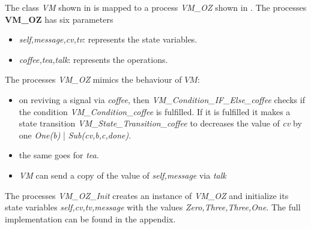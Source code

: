 The class \textit{VM} shown in  is mapped to a \picalc{} process \textit{VM\_OZ} shown in . The processes \textbf{VM\_OZ} has six parameters
\begin{itemize}
\item \textit{self,message,cv,tv}: represents the state variables.
\item \textit{coffee,tea,talk}: represents the operations.
\end{itemize}
The processes \textit{VM\_OZ} mimics the behaviour of $VM$:
\begin{itemize}
\item on reviving a signal via \textit{coffee}, then \textit{VM\_Condition\_IF\_Else\_coffee} checks if the condition \textit{VM\_Condition\_coffee} is fulfilled. If it is fulfilled it makes a state transition \textit{VM\_State\_Transition\_coffee} to decreases the value of \textit{cv} by one \textit{One(b) }| \textit{Sub(cv,b,c,done)}.
\item the same goes for \textit{tea}.
\item  \textit{VM} can send a copy of the value of  \textit{self,message} via  \textit{talk}
\end{itemize}
The processes \textit{VM\_OZ\_Init} creates an instance of \textit{VM\_OZ} and initialize its state variables \textit{self,cv,tv,message} with the values \textit{Zero,Three,Three,One}. The full implementation can be found in the appendix.

